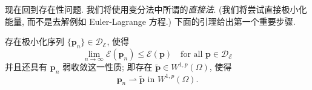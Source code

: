现在回到存在性问题. 我们将使用变分法中所谓的\emph{直接法}. (我们将尝试直接极小化能量, 而不是去解例如 Euler-Lagrange 方程.) 下面的引理给出第一个重要步骤.

\begin{Lemma}
\label{lem:elasticity-weakly-convergent-minimizing-sequence}
存在极小化序列 $\{\bm{p}_n\}\in\mathcal{D}_{\mathcal{E}}$, 使得
\begin{equation}\label{eq:elasticity-minimizing-sequence-energy-infimum}
\lim_{n\to\infty}\mathcal{E}(\bm{p}_n)\leq\mathcal{E}(\bm{p})\quad\text{for all }\bm{p}\in\mathcal{D}_{\mathcal{E}}
\end{equation}
并且还具有 $\bm{p}_n$ 弱收敛这一性质; 即存在 $\widetilde{\bm{p}}\in W^{1,p}(\Omega)$, 使得
\begin{equation}\label{eq:elasticity-minimizing-sequence-weak-limit}
\bm{p}_n\rightharpoonup\widetilde{\bm{p}}\text{ in }W^{1,p}(\Omega).
\end{equation}

\end{Lemma}

